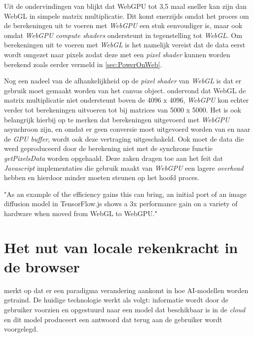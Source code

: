 Uit de ondervindingen van \textcite{Radin2021} blijkt dat WebGPU tot 3,5 maal sneller kan zijn dan WebGL in simpele matrix multiplicatie. Dit komt enerzijds omdat het proces om de berekeningen uit te voeren met \textit{WebGPU} een stuk eenvoudiger is, maar ook omdat \textit{WebGPU} \textit{compute shaders} ondersteunt in tegenstelling tot \textit{WebGL}. Om berekeningen uit te voeren met \textit{WebGL} is het namelijk vereist dat de data eerst wordt omgezet naar pixels zodat deze met een \textit{pixel shader} kunnen worden berekend zoals eerder vermeld in \ref{sec:PowerOnWeb}. 

\bigbreak{}

Nog een nadeel van de afhankelijkheid op de \textit{pixel shader} van \textit{WebGL} is dat er gebruik moet gemaakt worden van het canvas object. \textcite{Radin2021} ondervond dat WebGL de matrix multiplicatie niet ondersteunt boven de 4096 x 4096, \textit{WebGPU} kon echter verder tot berekeningen uitvoeren tot bij matrices van 5000 x 5000. Het is ook belangrijk hierbij op te merken dat berekeningen uitgevoerd met \textit{WebGPU} asynchroon zijn, en omdat er geen conversie moet uitgevoerd worden van en naar de \textit{GPU buffer}, wordt ook deze vertraging uitgeschakeld. Ook moet de data die werd geproduceerd door de berekening niet met de synchrone functie \textit{getPixelsData} worden opgehaald. Deze zaken dragen toe aan het feit dat \textit{Javascript} implementaties die gebruik maakt van \textit{WebGPU} een lagere \textit{overhead} hebben en hierdoor minder moeten steunen op het hoofd proces.

\bigbreak{}

\begin{displayquote}
    "As an example of the efficiency gains this can bring, an initial port of an image diffusion model in TensorFlow.js shows a 3x performance gain on a variety of hardware when moved from WebGL to WebGPU."
\end{displayquote}

\break{}

\section{Het nut van locale rekenkracht in de browser} 

\textcite{Fleetwood2022} merkt op dat er een paradigma verandering aankomt in hoe AI-modellen worden getraind. De huidige technologie werkt als volgt: informatie wordt door de gebruiker voorzien en opgestuurd naar een model dat beschikbaar is in de \textit{cloud} en dit model produceert een antwoord dat terug aan de gebruiker wordt voorgelegd.

